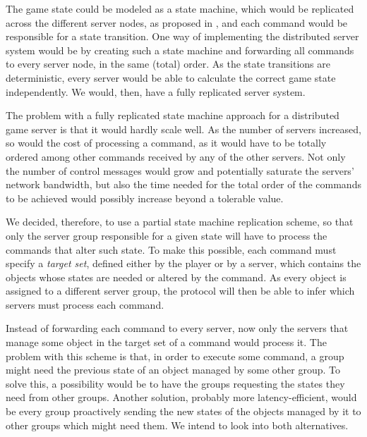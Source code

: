 \documentclass[]{usiinfprospectus}
\begin{document}
The game state could be modeled as a state machine, which would be replicated across the different server nodes, as proposed in \cite{lamport1978ird,schneider1990ift,lampson1996hbh}, and each command would be responsible for a state transition. One way of implementing the distributed server system would be by creating such a state machine and forwarding all commands to every server node, in the same (total) order. As the state transitions are deterministic, every server would be able to calculate the correct game state independently. %
We would, then, have a fully replicated server system.

The problem with a fully replicated state machine approach for a distributed game server is that it would hardly scale well. As the number of servers increased, so would the cost of processing a command, as it would have to be totally ordered among other commands received by any of the other servers. Not only the number of control messages would grow and potentially saturate the servers' network bandwidth, but also the time needed for the total order of the commands to be achieved would possibly increase beyond a tolerable value.

We decided, therefore, to use a partial state machine replication scheme, so that only the server group responsible for a given state will have to process the commands that alter such state. To make this possible, each command must specify a \emph{target set}, defined either by the player or by a server, which contains the objects whose states are needed or altered by the command. As every object is assigned to a different server group, the protocol will then be able to infer which servers must process each command.


Instead of forwarding each command to every server, now only the servers that manage some object in the target set of a command would process it. %
The problem with this scheme is that, in order to execute some command, a group might need the previous state of an object managed by some other group. To solve this, a possibility would be to have the groups requesting the states they need from other groups. Another solution, probably more latency-efficient, would be every group proactively sending the new states of the objects managed by it to other groups which might need them. We intend to look into both alternatives.
\end{document}
